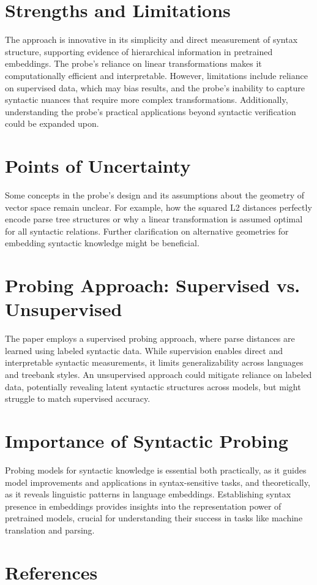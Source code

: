 \documentclass[11pt]{article}
\begin{document}
\section*{Strengths and Limitations}
The approach is innovative in its simplicity and direct measurement of syntax structure, supporting evidence of hierarchical information in pretrained embeddings. The probe’s reliance on linear transformations makes it computationally efficient and interpretable. However, limitations include reliance on supervised data, which may bias results, and the probe's inability to capture syntactic nuances that require more complex transformations. Additionally, understanding the probe's practical applications beyond syntactic verification could be expanded upon.

\section*{Points of Uncertainty}
Some concepts in the probe's design and its assumptions about the geometry of vector space remain unclear. For example, how the squared L2 distances perfectly encode parse tree structures or why a linear transformation is assumed optimal for all syntactic relations. Further clarification on alternative geometries for embedding syntactic knowledge might be beneficial.

\section*{Probing Approach: Supervised vs. Unsupervised}
The paper employs a supervised probing approach, where parse distances are learned using labeled syntactic data. While supervision enables direct and interpretable syntactic measurements, it limits generalizability across languages and treebank styles. An unsupervised approach could mitigate reliance on labeled data, potentially revealing latent syntactic structures across models, but might struggle to match supervised accuracy.

\section*{Importance of Syntactic Probing}
Probing models for syntactic knowledge is essential both practically, as it guides model improvements and applications in syntax-sensitive tasks, and theoretically, as it reveals linguistic patterns in language embeddings. Establishing syntax presence in embeddings provides insights into the representation power of pretrained models, crucial for understanding their success in tasks like machine translation and parsing.

\section*{References}
\end{document}
